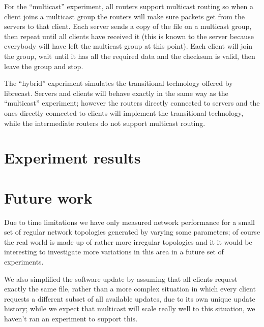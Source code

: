 \documentclass[a4paper,12pt]{article}
\begin{document}
For the ``multicast'' experiment, all routers support
multicast routing so when a client joins a multicast group
the routers will make sure packets get from the servers to
that client.  Each server sends a copy of the file on a
multicast group, then repeat until all clients have received
it (this is known to the server because everybody will have
left the multicast group at this point).  Each client will
join the group, wait until it has all the required data and
the checksum is valid, then leave the group and stop.

The ``hybrid'' experiment simulates the transitional technology
offered by librecast. Servers and clients will behave exactly
in the same way as the ``multicast'' experiment; however the
routers directly connected to servers and the ones directly
connected to clients will implement the transitional technology,
while the intermediate routers do not support multicast routing.

\section{Experiment results}
\label{results}

\section{Future work}
\label{future}

Due to time limitations we have only measured network performance
for a small set of regular network topologies generated by varying
some parameters; of course the real world is made up of rather
more irregular topologies and it it would be interesting to investigate
more variations in this area in a future set of experiments.

We also simplified the software update by assuming that all clients
request exactly the same file, rather than a more complex situation
in which every client requests a different subset of all available
updates, due to its own unique update history; while we expect that
multicast will scale really well to this situation, we haven't
ran an experiment to support this.
\end{document}
